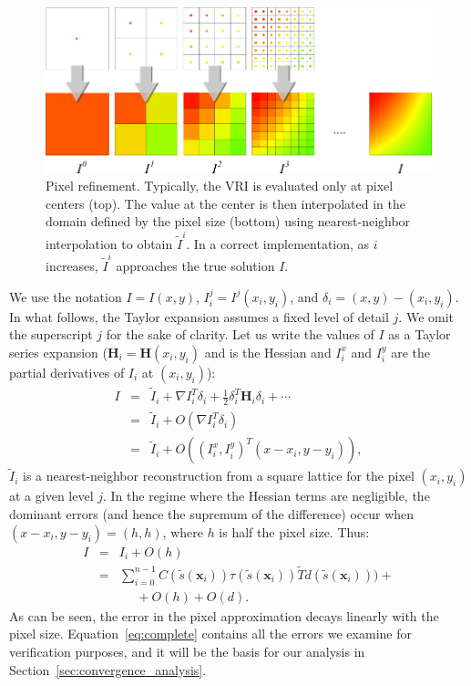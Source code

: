 \begin{figure}[b]
\centering
\includegraphics[width=0.95\linewidth]{chapter5/figures/pixel-size-convergence.png}
\caption{\label{fig:pixel_size_refinement} Pixel refinement. Typically, the VRI is evaluated
only at pixel centers (top). The value at the center is then interpolated in the domain defined by the pixel size (bottom) using
nearest-neighbor interpolation to obtain $\tilde{I}^i$. In a correct
implementation, as $i$ increases, $\tilde{I}^i$ approaches the true
solution $I$.}
\end{figure}


We use the notation $I = I(x,y)$, $I^j_i = I^j(x_i, y_i)$, and $\delta_i =
(x, y) - (x_i, y_i)$. In what follows, the Taylor expansion assumes a fixed level of detail $j$. 
We omit the superscript $j$ for the sake of clarity. Let us write
 the values of $I$ as a Taylor series expansion ($\mathbf{H}_i = 
 \mathbf{H}(x_i, y_i)$ and is the Hessian and $I_i^x$ and $I_i^y$ 
 are the partial derivatives of $I_i$ at $(x_i, y_i)$):
\begin{eqnarray}
I &=& \tilde{I}_i + \nabla I_i^T \delta_i + \frac{1}{2}\delta_i^T \mathbf{H}_i
\delta_i + \cdots \\
  &=& \tilde{I}_i + O(\nabla I_i^T \delta_i)\\
  &=& \tilde{I}_i + O( (I_i^x, I_i^y)^T (x - x_i, y - y_i)),
\end{eqnarray}
$\tilde{I}_i$ is a nearest-neighbor reconstruction from a square
lattice for the pixel $(x_i, y_i)$ at a given level $j$. In the regime where the Hessian terms are negligible, the
dominant errors (and hence the supremum of the difference) occur 
when $(x - x_i, y - y_i) = (h, h)$, where $h$ is half the pixel size.
Thus: 
\begin{eqnarray}
I &=& I_i + O(h)\\
&=& \sum_{i = 0} ^ {n - 1} C (\tilde{s}(\mathbf{x}_i))\tau(
\tilde{s}( \mathbf{x}_i)) \tilde{T}d(\tilde{s}(\mathbf{x}_i))) +\nonumber\\
&& ~~~~~~ + O(h) + O(d). \label{eq:complete}
\end{eqnarray}
As can be seen, the error in the pixel approximation decays linearly with the pixel
size. Equation~\eqref{eq:complete} contains all the errors we examine for
verification purposes, and it will be the basis for our analysis in
Section~\ref{sec:convergence_analysis}.

